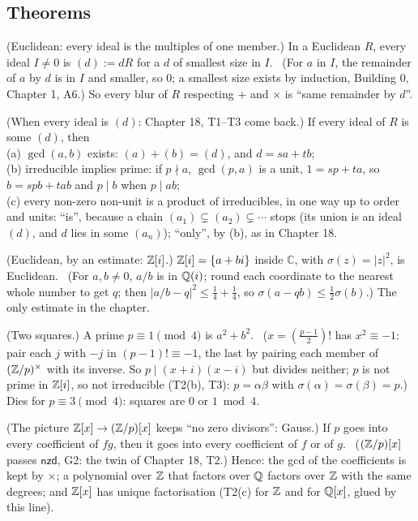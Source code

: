 \subsection*{Theorems}

\begin{lines}
\item[\lab{T1}] (Euclidean: every ideal is the multiples of one member.) In a Euclidean $R$, every ideal $I \ne 0$ is $(d) := dR$ for a $d$ of smallest size in $I$. \ (For $a$ in $I$, the remainder of $a$ by $d$ is in $I$ and smaller, so $0$; a smallest size exists by induction, Building 0, Chapter 1, A6.) So every blur of $R$ respecting $+$ and $\times$ is ``same remainder by $d$''.
\item[\lab{T2}] (When every ideal is $(d)$: Chapter 18, T1--T3 come back.) If every ideal of $R$ is some $(d)$, then \\
(a) $\gcd(a, b)$ exists: $(a) + (b) = (d)$, and $d = sa + tb$; \\
(b) irreducible implies prime: if $p \nmid a$, $\gcd(p, a)$ is a unit, $1 = sp + ta$, so $b = spb + tab$ and $p \mid b$ when $p \mid ab$; \\
(c) every non-zero non-unit is a product of irreducibles, in one way up to order and units: ``is'', because a chain $(a_1) \subsetneq (a_2) \subsetneq \cdots$ stops (its union is an ideal $(d)$, and $d$ lies in some $(a_n)$); ``only'', by (b), as in Chapter 18.
\item[\lab{T3}] (Euclidean, by an estimate: $\mathbb{Z}[i]$.) $\mathbb{Z}[i] = \{a + bi\}$ inside $\mathbb{C}$, with $\sigma(z) = |z|^2$, is Euclidean. \ (For $a, b \ne 0$, $a/b$ is in $\mathbb{Q}(i)$; round each coordinate to the nearest whole number to get $q$; then $|a/b - q|^2 \le \tfrac14 + \tfrac14$, so $\sigma(a - qb) \le \tfrac12 \sigma(b)$.) The only estimate in the chapter.
\item[\lab{T4}] (Two squares.) A prime $p \equiv 1 \pmod 4$ is $a^2 + b^2$. \ ($x = (\tfrac{p-1}{2})!$ has $x^2 \equiv -1$: pair each $j$ with $-j$ in $(p-1)! \equiv -1$, the last by pairing each member of $(\mathbb{Z}/p)^\times$ with its inverse. So $p \mid (x + i)(x - i)$ but divides neither; $p$ is not prime in $\mathbb{Z}[i]$, so not irreducible (T2(b), T3): $p = \alpha\beta$ with $\sigma(\alpha) = \sigma(\beta) = p$.) Dies for $p \equiv 3 \pmod 4$: squares are $0$ or $1 \bmod 4$.
\item[\lab{T5}] (The picture $\mathbb{Z}[x] \to (\mathbb{Z}/p)[x]$ keeps ``no zero divisors'': Gauss.) If $p$ goes into every coefficient of $fg$, then it goes into every coefficient of $f$ or of $g$. \ ($(\mathbb{Z}/p)[x]$ passes $\mathsf{nzd}$, G2: the twin of Chapter 18, T2.) Hence: the gcd of the coefficients is kept by $\times$; a polynomial over $\mathbb{Z}$ that factors over $\mathbb{Q}$ factors over $\mathbb{Z}$ with the same degrees; and $\mathbb{Z}[x]$ has unique factorisation (T2(c) for $\mathbb{Z}$ and for $\mathbb{Q}[x]$, glued by this line).

\end{lines}
